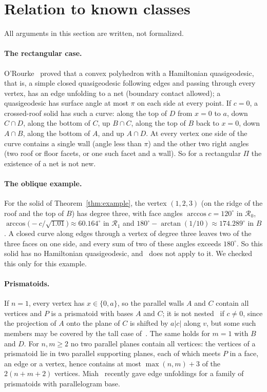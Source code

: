 \documentclass[11pt]{article}
\theoremstyle{definition}
\theoremstyle{remark}
\newcommand{\cR}{\mathcal R}
\begin{document}
\section{Relation to known classes}\label{sec:prior}

\noindent All arguments in this section are written, not formalized.


\paragraph{The rectangular case.} O'Rourke~\cite[Theorem~1]{oro22} proved
that a convex polyhedron with a Hamiltonian quasigeodesic, that is, a simple
closed quasigeodesic following edges and passing through every vertex, has an
edge unfolding to a net (boundary contact allowed); a quasigeodesic has
surface angle at most $\pi$ on each side at every point. If $c=0$, a
crossed-roof solid has such a curve: along the top of $D$ from $x=0$ to $a$,
down $C\cap D$, along the bottom of $C$, up $B\cap C$, along the top of $B$
back to $x=0$, down $A\cap B$, along the bottom of $A$, and up $A\cap D$. At every
vertex one side of the curve contains a single wall (angle less than $\pi$)
and the other two right angles (two roof or floor facets, or one such facet
and a wall). So for a
rectangular $\Pi$ the existence of a net is not new.

\paragraph{The oblique example.} For the solid of Theorem~\ref{thm:example},
the vertex $(1,2,3)$ (on the ridge of the roof and the top of $B$) has degree
three, with face angles $\arccos c=120^\circ$ in $\cR_0$,
$\arccos\bigl(-c/\sqrt{1.01}\bigr)\approx60.164^\circ$ in $\cR_1$ and
$180^\circ-\arctan(1/10)\approx174.289^\circ$ in $B$. A closed curve along
edges through a vertex of degree three leaves two of the three faces on one
side, and every sum of two of these angles exceeds $180^\circ$. So this solid
has no Hamiltonian quasigeodesic, and~\cite{oro22} does not apply to it. We
checked this only for this example.

\paragraph{Prismatoids.} If $n=1$, every vertex has $x\in\{0,a\}$, so the
parallel walls $A$ and $C$ contain all vertices and $P$ is a prismatoid with
bases $A$ and $C$; it is not nested~\cite{radons} if $c\ne0$, since the
projection of $A$ onto the plane of $C$ is shifted by $a|c|$ along $v$, but
some such members may be covered by the tall case of~\cite{bdm}. The same
holds for $m=1$ with $B$ and $D$. For $n,m\ge2$ no two parallel planes contain
all vertices: the vertices of a prismatoid lie in two parallel supporting
planes, each of which meets $P$ in a face, an edge or a vertex, hence
contains at most $\max(n,m)+3$ of the $2(n+m+2)$ vertices. Miah~\cite{miah}
recently gave edge unfoldings for a family of prismatoids with parallelogram
base.
\end{document}
